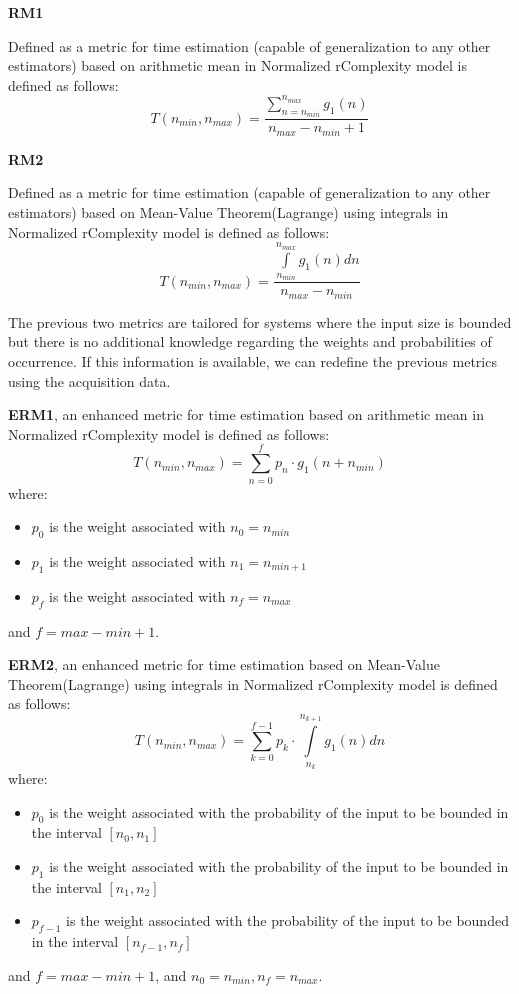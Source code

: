 \begin{definition} \textbf{RM1}

Defined as a metric for time estimation (capable of generalization to any other estimators) based on arithmetic mean in Normalized rComplexity model is defined as follows:
\[  T(n_{min}, n_{max}) = \dfrac{\sum\limits_{n=n_{min}}^{n_{max}} g_{1}(n)}{n_{max} - n_{min} + 1}  \]
\end{definition}

\begin{definition} \textbf{RM2}

Defined as a metric for time estimation (capable of generalization to any other estimators) based on Mean-Value Theorem(Lagrange) using integrals in Normalized rComplexity model is defined as follows:
\[  T(n_{min}, n_{max}) = \dfrac{\int\limits_{n_{min}}^{n_{max}} g_{1}(n) dn}{n_{max} - n_{min}}  \]
\end{definition}

The previous two metrics are tailored for systems where the input size is bounded but there is no additional knowledge regarding the weights and probabilities of occurrence. If this information is available, we can redefine the previous metrics using the acquisition data.

\begin{definition} \textbf{ERM1}, an enhanced metric for time estimation based on arithmetic mean in Normalized rComplexity model is defined as follows:
\[  T(n_{min}, n_{max}) = \sum\limits_{n=0}^{f} p_{n} \cdot g_{1}(n + n_{min})  \]
where:
\begin{itemize}
	\item $p_{0}$ is the weight associated with $n_{0} = n_{min}$
	\item $p_{1}$ is the weight associated with $n_{1} = n_{min + 1}$
	\item $p_{f}$ is the weight associated with $n_{f} = n_{max}$
\end{itemize}
and $f = max - min + 1$.
\end{definition}

\begin{definition} \textbf{ERM2}, an enhanced metric for time estimation based on Mean-Value Theorem(Lagrange) using integrals in Normalized rComplexity model is defined as follows:
\[  T(n_{min}, n_{max}) =\sum\limits_{k=0}^{f-1} p_{k} \cdot \int\limits_{n_{k}}^{n_{k+1}} g_{1}(n) dn  \]
where:
\begin{itemize}
	\item $p_{0}$ is the weight associated with the probability of the input to be bounded in the interval $[n_{0}, n_{1}]$
	\item $p_{1}$ is the weight associated with the probability of the input to be bounded in the interval $[n_{1}, n_{2}]$
	\item $p_{f-1}$ is the weight associated with the probability of the input to be bounded in the interval $[n_{f-1}, n_{f}]$
\end{itemize}
and $f = max - min + 1$, and $n_{0} = n_{min}, n_{f} = n_{max}$.
\end{definition}

